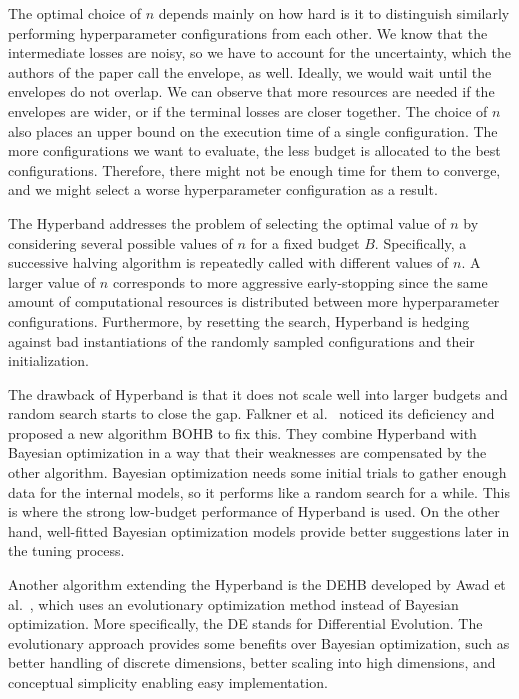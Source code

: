The optimal choice of $n$ depends mainly on how hard is it to distinguish similarly performing hyperparameter configurations from each other. We know that the intermediate losses are noisy, so we have to account for the uncertainty, which the authors of the paper call the envelope, as well. Ideally, we would wait until the envelopes do not overlap. We can observe that more resources are needed if the envelopes are wider, or if the terminal losses are closer together. The choice of $n$ also places an upper bound on the execution time of a single configuration. The more configurations we want to evaluate, the less budget is allocated to the best configurations. Therefore, there might not be enough time for them to converge, and we might select a worse hyperparameter configuration as a result.

The Hyperband addresses the problem of selecting the optimal value of $n$ by considering several possible values of $n$ for a fixed budget $B$. Specifically, a successive halving algorithm is repeatedly called with different values of $n$. A larger value of $n$ corresponds to more aggressive early-stopping since the same amount of computational resources is distributed between more hyperparameter configurations. Furthermore, by resetting the search, Hyperband is hedging against bad instantiations of the randomly sampled configurations and their initialization.

The drawback of Hyperband is that it does not scale well into larger budgets and random search starts to close the gap. Falkner et al.~\cite{falkner2018bohb} noticed its deficiency and proposed a new algorithm BOHB to fix this. They combine Hyperband with Bayesian optimization in a way that their weaknesses are compensated by the other algorithm. Bayesian optimization needs some initial trials to gather enough data for the internal models, so it performs like a random search for a while. This is where the strong low-budget performance of Hyperband is used. On the other hand, well-fitted Bayesian optimization models provide better suggestions later in the tuning process.

Another algorithm extending the Hyperband is the DEHB developed by Awad et al.~\cite{awad2021dehb}, which uses an evolutionary optimization method instead of Bayesian optimization. More specifically, the DE stands for Differential Evolution. The evolutionary approach provides some benefits over Bayesian optimization, such as better handling of discrete dimensions, better scaling into high dimensions, and conceptual simplicity enabling easy implementation.

